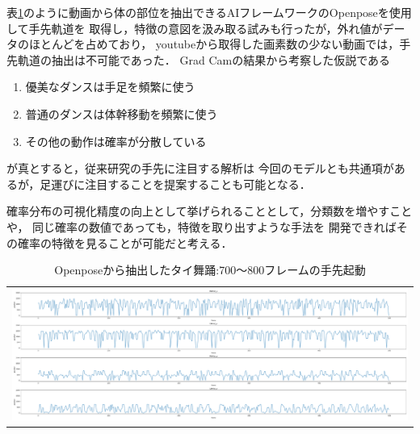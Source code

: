 表\ref{json}のように動画から体の部位を抽出できるAIフレームワークのOpenposeを使用して手先軌道を
取得し，特徴の意図を汲み取る試みも行ったが，外れ値がデータのほとんどを占めており，
youtubeから取得した画素数の少ない動画では，手先軌道の抽出は不可能であった．
Grad Camの結果から考察した仮説である
\begin{enumerate}
  \item 優美なダンスは手足を頻繁に使う
  \item 普通のダンスは体幹移動を頻繁に使う
  \item その他の動作は確率が分散している
\end{enumerate}
が真とすると，従来研究の手先に注目する解析は
今回のモデルとも共通項があるが，足運びに注目することを提案することも可能となる．

確率分布の可視化精度の向上として挙げられることとして，分類数を増やすことや，
同じ確率の数値であっても，特徴を取り出すような手法を
開発できればその確率の特徴を見ることが可能だと考える．

\begin{table}[b]
  \begin{center}
    \begin{tabular}{c}
      \includegraphics[width=130mm]{images/dist/thai_elegant_json.pdf} \\
    \end{tabular}
  \end{center}
  \caption{Openposeから抽出したタイ舞踊:700〜800フレームの手先起動}
  \label{json}
\end{table}
\clearpage
